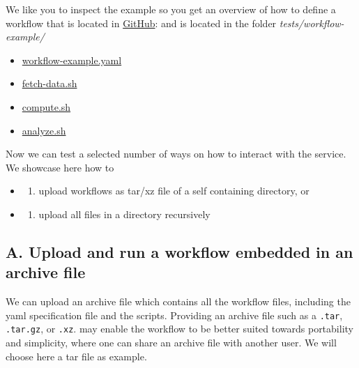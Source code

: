 We like you to inspect the example so you get an overview of how to
define a workflow that is located in
\href{https://github.com/cloudmesh/cloudmesh-cc/tree/main/tests/workflow-example}{GitHub}:
and is located in the folder \emph{tests/workflow-example/}

\begin{itemize}
\tightlist
\item
  \href{https://github.com/cloudmesh/cloudmesh-cc/blob/main/tests/workflow-example/workflow-example.yaml}{workflow-example.yaml}
\item
  \href{https://github.com/cloudmesh/cloudmesh-cc/blob/main/tests/workflow-example/fetch-data.sh}{fetch-data.sh}
\item
  \href{https://github.com/cloudmesh/cloudmesh-cc/blob/main/tests/workflow-example/compute.sh}{compute.sh}
\item
  \href{https://github.com/cloudmesh/cloudmesh-cc/blob/main/tests/workflow-example/analyze.sh}{analyze.sh}
\end{itemize}

Now we can test a selected number of ways on how to interact with the
service. We showcase here how to

\begin{itemize}
\item
  \begin{enumerate}
  \def\labelenumi{\Alph{enumi}.}
  \tightlist
  \item
    upload workflows as tar/xz file of a self containing directory, or
  \end{enumerate}
\item
  \begin{enumerate}
  \def\labelenumi{\Alph{enumi}.}
  \setcounter{enumi}{1}
  \tightlist
  \item
    upload all files in a directory recursively
  \end{enumerate}
\end{itemize}

\hypertarget{a.-upload-and-run-a-workflow-embedded-in-an-archive-file}{%
\subsection{A. Upload and run a workflow embedded in an archive
file}\label{a.-upload-and-run-a-workflow-embedded-in-an-archive-file}}

We can upload an archive file which contains all the workflow files,
including the yaml specification file and the scripts. Providing an
archive file such as a \texttt{.tar}, \texttt{.tar.gz}, or \texttt{.xz}.
may enable the workflow to be better suited towards portability and
simplicity, where one can share an archive file with another user. We
will choose here a tar file as example.

